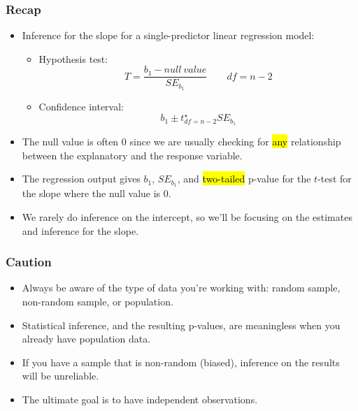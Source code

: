 \documentclass[slidestop,compress,mathserif]{beamer}
\begin{document}
\begin{frame}
\frametitle{Recap}

\begin{itemize}

\item Inference for the slope for a single-predictor linear regression model:
\pause
\begin{itemize}
\item Hypothesis test:
\[ T = \frac{b_1 - null~value}{SE_{b_1}} \qquad df = n - 2 \]
\pause
\item Confidence interval:
\[ b_1 \pm t^\star_{df = n - 2} SE_{b_1} \]
\end{itemize}

\pause

\item The null value is often 0 since we are usually checking for \hl{any} relationship between the explanatory and the response variable.

\pause

\item The regression output gives $b_1$, $SE_{b_1}$, and \hl{two-tailed} p-value for the $t$-test for the slope where the null value is 0.

\pause

\item We rarely do inference on the intercept, so we'll be focusing on the estimates and inference for the slope.

\end{itemize}

\end{frame}



\begin{frame}
\frametitle{Caution}

\begin{itemize}

\item Always be aware of the type of data you're working with: random sample, non-random sample, or population.

\pause

\item Statistical inference, and the resulting p-values, are meaningless when you already have population data.

\pause

\item If you have a sample that is non-random (biased), inference on the results will be unreliable.

\pause

\item The ultimate goal is to have independent observations.

\end{itemize}

\end{frame}

\end{document}
